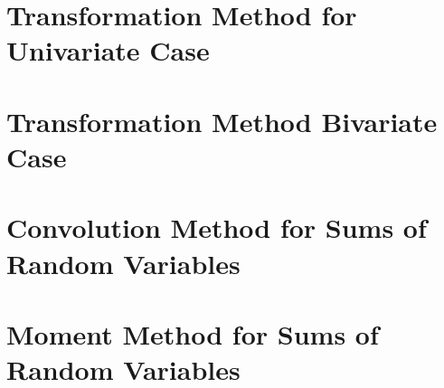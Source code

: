 %
\section{Transformation Method for Univariate Case}

\section{Transformation Method Bivariate Case}

\section{Convolution Method for Sums of Random Variables}

\section{Moment Method for Sums of Random Variables}

